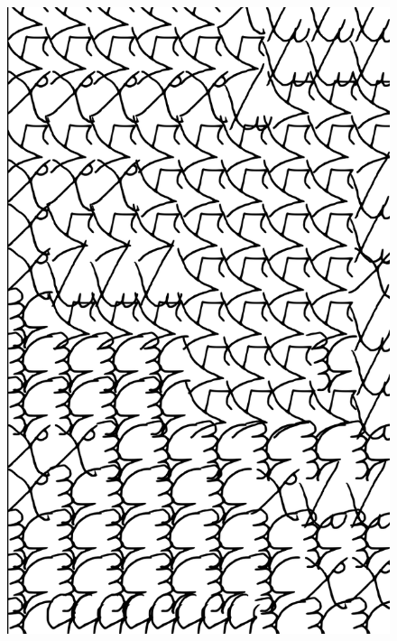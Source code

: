 \makeatletter\@openrightfalse
\movetooddpage
\begin{absolutelynopagebreak}
\begin{vplace}
\begin{figure}[H]
\begin{adjustwidth}{-0.99cm}{}
  \centering
  \vspace*{-1.97cm}
  \hspace*{-0.65cm}
  \includegraphics[width=115mm]{./imgs/img13.pdf}  
  \hfill
\end{adjustwidth}

\thispagestyle{empty}

\end{figure}
\end{vplace}

\end{absolutelynopagebreak}

